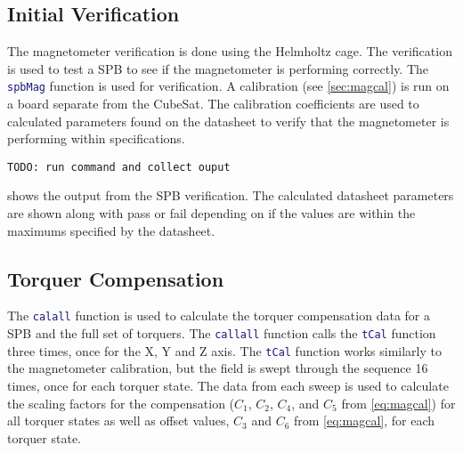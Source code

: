 \subsection{Initial Verification}

The magnetometer verification is done using the Helmholtz cage. The verification is used to test a \ac{SPB} to see if the magnetometer is performing correctly. The \lstinline[style=code,language=Matlab]$spbMag$ function is used for verification. A calibration (see \cref{sec:magcal}) is run on a board separate from the CubeSat. The calibration coefficients are used to calculated parameters found on the datasheet to verify that the magnetometer is performing within specifications.

\begin{lstlisting}[caption={\ac{SPB} verification results},label={lst:vspb-res},language=verbatim]
TODO: run command and collect ouput
\end{lstlisting}

 shows the output from the \ac{SPB} verification. The calculated datasheet parameters are shown along with pass or fail depending on if the values are within the maximums specified by the datasheet.


\subsection{Torquer Compensation}

\label{sec:tst-tq-comp}

The \lstinline[style=code,language=Matlab]$calall$ function is used to calculate the torquer compensation data for a \ac{SPB} and the full set of torquers. The \lstinline[style=code,language=Matlab]$callall$ function calls the \lstinline[style=code,language=Matlab]$tCal$ function three times, once for the X, Y and Z axis. The \lstinline[style=code,language=Matlab]$tCal$ function works similarly to the magnetometer calibration, but the field is swept through the sequence 16 times, once for each torquer state. The data from each sweep is used to calculate the scaling factors for the compensation ($C_1$, $C_2$, $C_4$, and $C_5$ from \cref{eq:magcal}) for all torquer states as well as offset values, $C_3$ and $C_6$ from \cref{eq:magcal}, for each torquer state.

